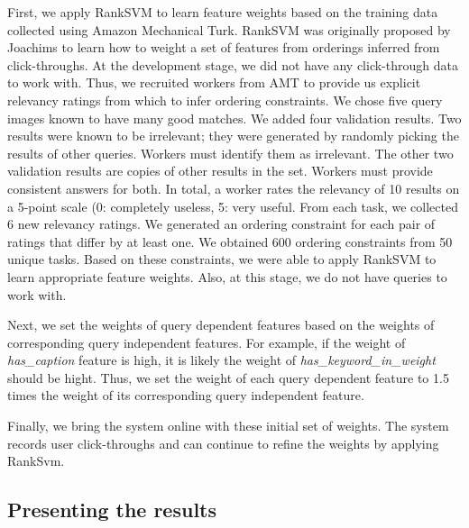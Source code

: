 \documentclass{www2010-submission}
\begin{document}
First, we apply RankSVM to learn feature weights based on the training
data collected using Amazon Mechanical Turk. RankSVM was originally
proposed by Joachims \cite{Joachims} to learn how to weight a set of
features from orderings inferred from click-throughs. At the
development stage, we did not have any click-through data to work
with. Thus, we recruited workers from AMT to provide us explicit
relevancy ratings from which to infer ordering constraints. We chose
five query images known to have many good matches. We added four
validation results.  Two results were known to be irrelevant; they
were generated by randomly picking the results of other
queries. Workers must identify them as irrelevant. The other two
validation results are copies of other results in the set. Workers
must provide consistent answers for both. In total, a worker rates the
relevancy of 10 results on a 5-point scale (0: completely useless, 5:
very useful. From each task, we collected 6 new relevancy ratings. We
generated an ordering constraint for each pair of ratings that differ
by at least one. We obtained 600 ordering constraints from 50 unique
tasks. Based on these constraints, we were able to apply RankSVM to
learn appropriate feature weights. Also, at this stage, we do not have
queries to work with.

Next, we set the weights of query dependent features based on the
weights of corresponding query independent features. For example, if
the weight of \emph{has\_caption} feature is high, it is likely the
weight of \emph{has\_keyword\_in\_weight} should be hight. Thus, we set
the weight of each query dependent feature to 1.5 times the weight of
its corresponding query independent feature.

Finally, we bring the system online with these initial set of
weights. The system records user click-throughs and can continue to
refine the weights by applying RankSvm.

\subsection{Presenting the results}

\end{document}
